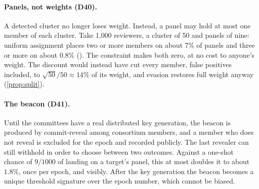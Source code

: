 \begin{table}[t]
\centering\small
\caption{Mean pairwise correlation on a long history (200 reviewers $\times$ 60 items, camps 40/60)
with a cartel of 10 minority-camp members who rate 5 majority-favoured items at $1.0$ plus jitter
$\sigma=0.05$. Last columns: share and number of honest pairs flagged at the threshold that catches
90\% of cartel pairs. Source: \texttt{scripts/revisions\_collusion.py}.}
\label{tab:rev-collusion}
\end{table}

\paragraph{Panels, not weights (D40).} A detected cluster no longer loses weight. Instead, a panel
may hold at most one member of each cluster. Take 1{,}000 reviewers, a cluster of 50 and panels of
nine: uniform assignment places two or more members on about 7\% of panels and three or more on
about 0.8\% (). The constraint makes both zero, at no cost to anyone's
weight. The discount would instead have cut every member, false positives included, to
$\sqrt{50}/50\approx14\%$ of its weight, and evasion restores full weight anyway
(\cref{prop:split}).

\paragraph{The beacon (D41).} Until the committees have a real distributed key generation, the
beacon is produced by commit-reveal among consortium members, and a member who does not reveal is
excluded for the epoch and recorded publicly. The last revealer can still withhold in order to
choose between two outcomes. Against a one-shot chance of $9/1000$ of landing on a target's panel,
this at most doubles it to about $1.8\%$, once per epoch, and visibly. After the key generation the
beacon becomes a unique threshold signature over the epoch number, which cannot be biased.
